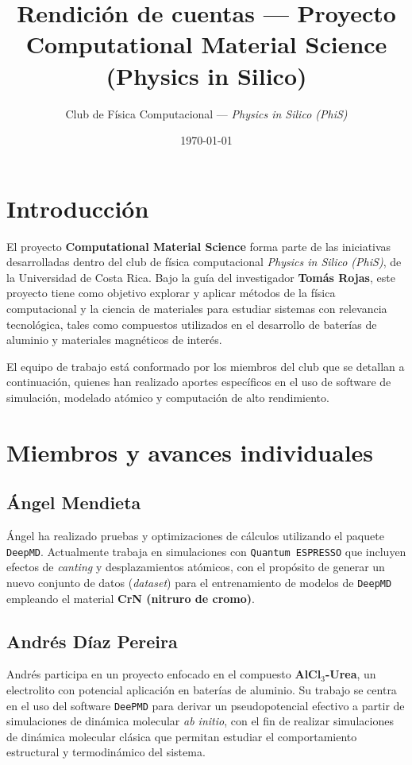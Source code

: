 \documentclass[10pt]{article}
\title{Rendición de cuentas --- Proyecto Computational Material Science (Physics in Silico)}
\author{Club de Física Computacional --- \textit{Physics in Silico (PhiS)}}
\date{\today}
\begin{document}
\maketitle

\section*{Introducción}

El proyecto \textbf{Computational Material Science} forma parte de las iniciativas desarrolladas dentro del club de física computacional \textit{Physics in Silico (PhiS)}, de la Universidad de Costa Rica. 
Bajo la guía del investigador \textbf{Tomás Rojas}, este proyecto tiene como objetivo explorar y aplicar métodos de la física computacional y la ciencia de materiales para estudiar sistemas con relevancia tecnológica, tales como compuestos utilizados en el desarrollo de baterías de aluminio y materiales magnéticos de interés.

El equipo de trabajo está conformado por los miembros del club que se detallan a continuación, quienes han realizado aportes específicos en el uso de software de simulación, modelado atómico y computación de alto rendimiento.

\section*{Miembros y avances individuales}

\subsection*{Ángel Mendieta}

Ángel ha realizado pruebas y optimizaciones de cálculos utilizando el paquete \texttt{DeepMD}. Actualmente trabaja en simulaciones con \texttt{Quantum ESPRESSO} que incluyen efectos de \textit{canting} y desplazamientos atómicos, con el propósito de generar un nuevo conjunto de datos (\textit{dataset}) para el entrenamiento de modelos de \texttt{DeepMD} empleando el material \textbf{CrN (nitruro de cromo)}.

\subsection*{Andrés Díaz Pereira}

Andrés participa en un proyecto enfocado en el compuesto \textbf{AlCl$_3$-Urea}, un electrolito con potencial aplicación en baterías de aluminio. 
Su trabajo se centra en el uso del software \texttt{DeePMD} para derivar un pseudopotencial efectivo a partir de simulaciones de dinámica molecular \textit{ab initio}, con el fin de realizar simulaciones de dinámica molecular clásica que permitan estudiar el comportamiento estructural y termodinámico del sistema.
\end{document}
